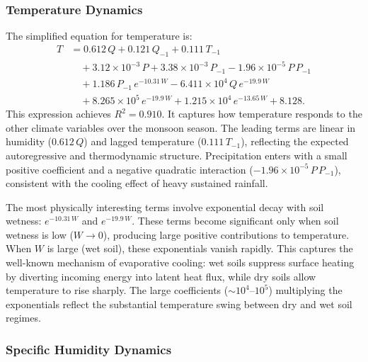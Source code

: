 \documentclass{article}
\begin{document}
\subsubsection{Temperature Dynamics}

The simplified equation for temperature is:
\begin{equation}
\begin{aligned}
T &= 0.612\, Q + 0.121\, Q_{-1} + 0.111\, T_{-1} \\
  &\quad + 3.12 \times 10^{-3}\, P + 3.38 \times 10^{-3}\, P_{-1} - 1.96 \times 10^{-5}\, P\, P_{-1} \\
  &\quad + 1.186\, P_{-1}\, e^{-10.31\, W} - 6.411 \times 10^{4}\, Q\, e^{-19.9\, W} \\
  &\quad + 8.265 \times 10^{5}\, e^{-19.9\, W} + 1.215 \times 10^{4}\, e^{-13.65\, W} + 8.128.
\end{aligned}
\label{eq:T}
\end{equation}
This expression achieves $R^2 = 0.910$. It captures how temperature responds to the other climate variables over the monsoon season. The leading terms are linear in humidity ($0.612\, Q$) and lagged temperature ($0.111\, T_{-1}$), reflecting the expected autoregressive and thermodynamic structure. Precipitation enters with a small positive coefficient and a negative quadratic interaction ($-1.96 \times 10^{-5}\, P\, P_{-1}$), consistent with the cooling effect of heavy sustained rainfall.

The most physically interesting terms involve exponential decay with soil wetness: $e^{-10.31\, W}$ and $e^{-19.9\, W}$. These terms become significant only when soil wetness is low ($W \to 0$), producing large positive contributions to temperature. When $W$ is large (wet soil), these exponentials vanish rapidly. This captures the well-known mechanism of evaporative cooling: wet soils suppress surface heating by diverting incoming energy into latent heat flux, while dry soils allow temperature to rise sharply. The large coefficients ($\sim 10^4$--$10^5$) multiplying the exponentials reflect the substantial temperature swing between dry and wet soil regimes.

\subsubsection{Specific Humidity Dynamics}
\end{document}
